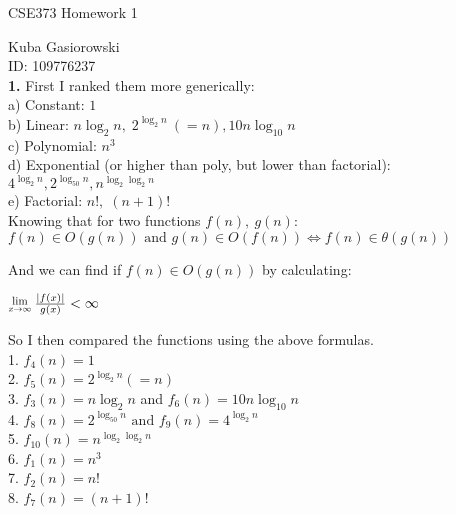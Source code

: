 \documentclass[12pt]{report}
\newcommand{\Lim}[1]{\raisebox{0.5ex}{\scalebox{0.8}{$\displaystyle \lim_{#1}\;$}}}
\newcommand{\no}{\noindent}
\newcommand{\tab}{\hspace*{.6cm}}
\begin{document}
	
	\Large
	\centering
	CSE373 Homework 1
	
	\justify
	\normalsize
	
	Kuba Gasiorowski\\
	ID: 109776237\\
	
	\no \textbf{1.} First I ranked them more generically:\\
	
	\no\tab a) Constant: $1$\\
	\tab b) Linear: $n\log_2 n, \; 2^{\log_2n}\:(= n), 10n\log_{10}n$\\
	\tab c) Polynomial: $n^3$ \\
	\tab d) Exponential (or higher than poly, but lower than factorial): $4^{\log_2n}, 2^{\log_{50}n}, n^{\log_2\log_2n}$ \\
	\tab e) Factorial: $n!, \; (n+1)!$\\
	
	\no Knowing that for two functions $f(n),\:g(n): $\\
	
	\centering 
	$f(n) \in O(g(n)) \text{ and } g(n) \in O(f(n)) \iff  f(n) \in \theta{}(g(n))$\\
	
	\justify
	
	And we can find if $ f(n) \in O(g(n))$ by calculating: \\ 
	
	\centering
	
	$\Lim{x\rightarrow\infty} \frac{|f(x)|}{g(x)} < \infty$
	
	\justify
	
	So I then compared the functions using the above formulas.\\
	
	\no \tab 1. $f_4(n) = 1$ \\
	\tab 2. $f_5(	n) = 2^{\log_2n} (= n)$ \\
	\tab 3. $f_3(n) = n\log_2n$ and $f_6(n) = 10n\log_{10}n$\\
	\tab 4. $f_8(n) = 2^{\log_{50}n} \text{ and } f_9(n) = 4^{\log_2n}$ \\
	\tab 5. $f_{10}(n) = n^{\log_2\log_2n}$\\
	\tab 6. $f_1(n) = n^3$ \\
	\tab 7. $f_2(n) = n!$ \\
	\tab 8. $f_7(n) = (n+1)!$\\
	
\end{document}

